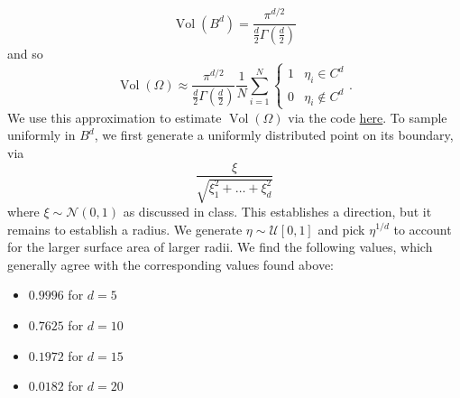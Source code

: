 \documentclass{../kin_math}
\begin{document}
\begin{questions}
\begin{enumerate}[label=\arabic*.]
\begin{solution}
\begin{equation*}
        \operatorname{Vol}(B^d) = \frac{\pi^{d / 2}}{\frac{d}{2} \Gamma\left(\frac{d}{2}\right)}
      \end{equation*}
      and so
      \begin{equation*}
        \operatorname{Vol}(\Omega) \approx \frac{\pi^{d / 2}}{\frac{d}{2} \Gamma\left(\frac{d}{2}\right)} \frac{1}{N} \sum_{i = 1}^N \begin{cases} 1 & \eta_i \in C^d \\ 0 & \eta_i \notin C^d \end{cases}.
      \end{equation*}
      We use this approximation to estimate $\operatorname{Vol}(\Omega)$ via the code \href{https://github.com/elijahkin/amsc660/blob/main/final/final.ipynb}{here}. To sample uniformly in $B^d$, we first generate a uniformly distributed point on its boundary, via
      \begin{equation*}
        \frac{\xi}{\sqrt{\xi_1^2 + \dots + \xi_d^2}}
      \end{equation*}
      where $\xi \sim \mathcal{N}(0, 1)$ as discussed in class. This establishes a direction, but it remains to establish a radius. We generate $\eta \sim \mathcal{U}[0, 1]$ and pick $\eta^{1 / d}$ to account for the larger surface area of larger radii. We find the following values, which generally agree with the corresponding values found above:
      \begin{itemize}
        \item $0.9996$ for $d = 5$
        \item $0.7625$ for $d = 10$
        \item $0.1972$ for $d = 15$
        \item $0.0182$ for $d = 20$
      \end{itemize}
    \end{solution}
  \end{enumerate}

\end{questions}
\end{document}
